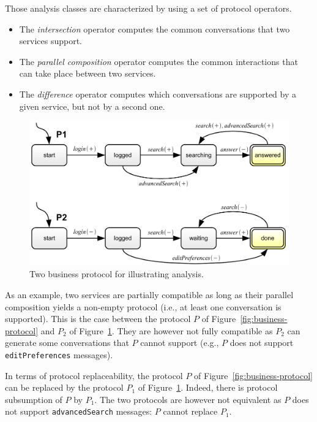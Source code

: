 Those analysis classes are characterized by using a set of protocol operators.
\begin{itemize}

	\item The \emph{intersection} operator computes the common conversations that two services support.
	
	\item The \emph{parallel composition} operator computes the common interactions that can take place between two services.
	
	\item The \emph{difference} operator computes which conversations are supported by a given service, but not by a second one.

\end{itemize}

\begin{figure}[htbp]
    \centering
    \includegraphics[width=\textwidth]{content/web-services/business-protocol-analysis}
    \caption{Two business protocol for illustrating analysis.} 
    \label{fig:business-protocol-analysis}
\end{figure}

As an example, two services are partially compatible as long as their parallel composition yields a non-empty protocol (i.e., at least one conversation is supported). This is the case between the protocol $P$ of Figure~\ref{fig:business-protocol} and $P_2$ of Figure~\ref{fig:business-protocol-analysis}. They are however not fully compatible as $P_2$ can generate some conversations that $P$ cannot support (e.g., $P$ does not support \texttt{editPreferences} messages).

In terms of protocol replaceability, the protocol $P$ of Figure~\ref{fig:business-protocol} can be replaced by the protocol $P_1$ of Figure~\ref{fig:business-protocol-analysis}. Indeed, there is protocol subsumption of $P$ by $P_1$. The two  protocols are however not equivalent as $P$ does not support \texttt{advancedSearch} messages: $P$ cannot replace $P_1$.

